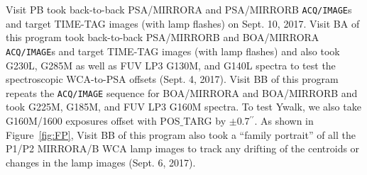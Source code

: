 \documentclass[12pt]{reportj}
\def\arcsec{\hbox{$^{\prime\prime}$}}
\newcommand{\pid}[1]{{\rm P}#1}
\newcommand{\tacq}[1]{\texttt{ACQ/#1}}
\begin{document}
Visit PB took back-to-back PSA/MIRRORA and PSA/MIRRORB \tacq{IMAGE}s and target TIME-TAG images (with lamp flashes) on Sept. 10, 2017.
Visit BA of this program took back-to-back PSA/MIRRORB and BOA/MIRRORA \tacq{IMAGE}s and target TIME-TAG images (with lamp flashes) and also took G230L, G285M as well as FUV LP3 G130M, and G140L spectra to test the spectroscopic WCA-to-PSA offsets (Sept. 4, 2017).
Visit BB of this program repeats the \tacq{IMAGE} sequence for BOA/MIRRORA and BOA/MIRRORB and took G225M, G185M, and FUV LP3 G160M spectra. To test Ywalk, we also take G160M/1600 exposures offset with {POS$\_$TARG} by $\pm$0.7\arcsec.
As shown in Figure~\ref{fig:FP}, Visit BB of this program also took a ``family portrait'' of all the P1/P2 MIRRORA/B WCA lamp images to track any drifting of the centroids or changes in the lamp images (Sept. 6, 2017).
\end{document}
